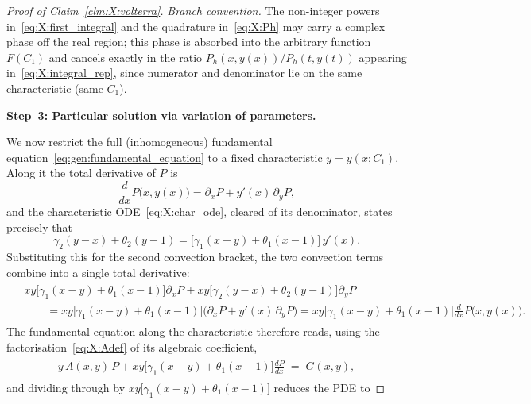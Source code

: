 \begin{proof}[Proof of Claim~\ref{clm:X:volterra}]
\smallskip\noindent\textit{Branch convention.}
The non-integer powers in~\eqref{eq:X:first_integral} and the quadrature
in~\eqref{eq:X:Ph} may carry a complex phase off the real region; this phase is absorbed
into the arbitrary function $F(C_1)$ and cancels exactly in the ratio
$P_h(x,y(x))/P_h(t,y(t))$ appearing in~\eqref{eq:X:integral_rep}, since numerator and
denominator lie on the same characteristic (same $C_1$).

\medskip\noindent\textbf{Step~3: Particular solution via variation of parameters.}

We now restrict the full (inhomogeneous) fundamental
equation~\eqref{eq:gen:fundamental_equation} to a fixed characteristic $y=y(x;C_1)$.
Along it the total derivative of $P$ is
\begin{equation}
    \frac{d}{dx}P\bigl(x,y(x)\bigr)=\partial_x P + y'(x)\,\partial_y P,
    \nonumber
\end{equation}
and the characteristic ODE~\eqref{eq:X:char_ode}, cleared of its denominator, states
precisely that
\begin{equation}
    \gamma_2(y-x)+\theta_2(y-1)
    = \bigl[\gamma_1(x-y)+\theta_1(x-1)\bigr]\,y'(x).
    \nonumber
\end{equation}
Substituting this for the second convection bracket, the two convection terms combine
into a single total derivative:
\begin{align}
    \begin{split}
        &xy\bigl[\gamma_1(x-y)+\theta_1(x-1)\bigr]\partial_x P
        + xy\bigl[\gamma_2(y-x)+\theta_2(y-1)\bigr]\partial_y P \\
        &\qquad
        = xy\bigl[\gamma_1(x-y)+\theta_1(x-1)\bigr]
          \bigl(\partial_x P + y'(x)\,\partial_y P\bigr)
        = xy\bigl[\gamma_1(x-y)+\theta_1(x-1)\bigr]\frac{d}{dx}P\bigl(x,y(x)\bigr).
    \end{split}
    \nonumber
\end{align}
The fundamental equation along the characteristic therefore reads, using the
factorisation~\eqref{eq:X:Adef} of its algebraic coefficient,
\begin{align}
    \begin{split}
        y\,A(x,y)\,P
        + xy\bigl[\gamma_1(x-y)+\theta_1(x-1)\bigr]\frac{dP}{dx}
        \;=\; G(x,y),
    \end{split}
    \nonumber
\end{align}
and dividing through by $xy\bigl[\gamma_1(x-y)+\theta_1(x-1)\bigr]$ reduces the PDE to

\end{proof}
